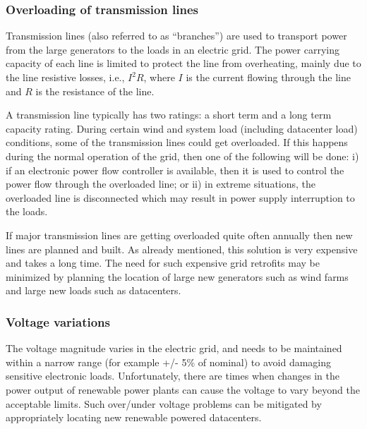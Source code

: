 \subsubsection{Overloading of transmission lines}
Transmission lines (also referred to as ``branches'') are used to
transport power from the large generators to the loads in an electric
grid. The power carrying capacity of each line is limited to protect
the line from overheating, mainly due to the line resistive losses,
i.e., $I^{2}R$, where $I$ is the current flowing through the line and
$R$ is the resistance of the line.

A transmission line typically has two ratings: a short term and a long
term capacity rating. During certain wind and system load (including
datacenter load) conditions, some of the transmission lines could get
overloaded. If this happens during the normal operation of the grid,
then one of the following will be done: i) if an electronic power flow
controller is available, then it is used to control the power flow
through the overloaded line; or ii) in extreme situations, the
overloaded line is disconnected which may result in power supply
interruption to the loads.

If major transmission lines are getting overloaded quite often
annually then new lines are planned and built.  As already mentioned,
this solution is very expensive and takes a long time. The need for
such expensive grid retrofits may be minimized by planning the
location of large new generators such as wind farms and large new
loads such as datacenters.

\subsubsection{Voltage variations}
The voltage magnitude varies in the electric grid, and needs to be maintained within a narrow range (for example +/- 5\% of nominal) to avoid damaging sensitive electronic loads.  Unfortunately, there are times when changes in the power output of renewable power plants can cause the voltage to vary beyond the acceptable limits. Such over/under voltage problems can be mitigated by appropriately locating new renewable powered datacenters.

